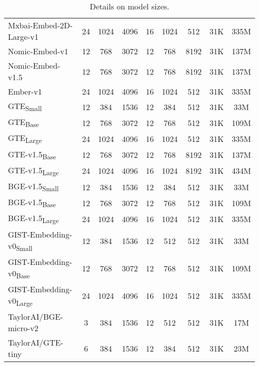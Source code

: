 \begin{table*}[ht!]
\begin{tabular}{lcccccccc}
      Mxbai-Embed-2D-Large-v1 & 24 & 1024 & 4096 & 16 & 1024 & 512 & 31K & 335M \\
      Nomic-Embed-v1 & 12 & 768 & 3072 & 12 & 768 & 8192 & 31K & 137M \\
      Nomic-Embed-v1.5 & 12 & 768 & 3072 & 12 & 768 & 8192 & 31K & 137M \\
      Ember-v1 & 24 & 1024 & 4096 & 16 & 1024 & 512 & 31K & 335M \\
      GTE\textsubscript{Small} & 12 & 384 & 1536 & 12 & 384 & 512 & 31K & 33M \\
      GTE\textsubscript{Base} & 12 & 768 & 3072 & 12 & 768 & 512 & 31K & 109M \\
      GTE\textsubscript{Large} & 24 & 1024 & 4096 & 16 & 1024 & 512 & 31K & 335M \\
      GTE-v1.5\textsubscript{Base} & 12 & 768 & 3072 & 12 & 768 & 8192 & 31K & 137M \\
      GTE-v1.5\textsubscript{Large} & 24 & 1024 & 4096 & 16 & 1024 & 8192 & 31K & 434M \\
      BGE-v1.5\textsubscript{Small} & 12 & 384 & 1536 & 12 & 384 & 512 & 31K & 33M \\
      BGE-v1.5\textsubscript{Base} & 12 & 768 & 3072 & 12 & 768 & 512 & 31K & 109M \\
      BGE-v1.5\textsubscript{Large} & 24 & 1024 & 4096 & 16 & 1024 & 512 & 31K & 335M \\
      GIST-Embedding-v0\textsubscript{Small} & 12 & 384 & 1536 & 12 & 512 & 512 & 31K & 33M \\
      GIST-Embedding-v0\textsubscript{Base}  & 12 & 768 & 3072 & 12 & 768 & 512 & 31K & 109M \\
      GIST-Embedding-v0\textsubscript{Large} & 24 & 1024 & 4096 & 16 & 1024 & 512 & 31K & 335M \\
      TaylorAI/BGE-micro-v2 & 3 & 384 & 1536 & 12 & 512 & 512 & 31K & 17M \\
      TaylorAI/GTE-tiny & 6 & 384 & 1536 & 12 & 384 & 512 & 31K & 23M \\
      \bottomrule
    \end{tabular}
    \caption{Details on model sizes.}
    \label{tab:parameters}
  \end{table*}
  
